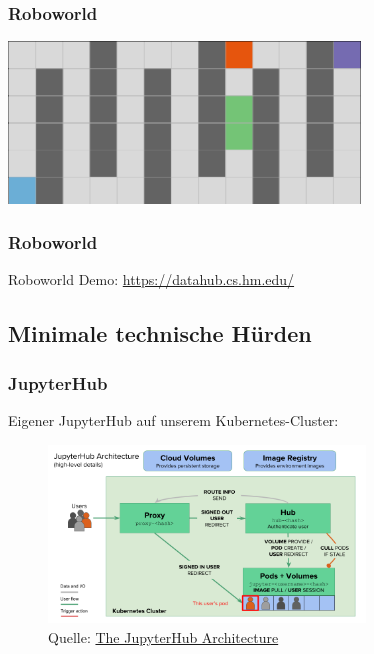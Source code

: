 \documentclass[german,aspectratio=169]{beamer}
\begin{document}
\begin{frame}
	\frametitle{Roboworld}
	\begin{center}
		\includegraphics[width=0.7\textwidth]{./figs/world-simple-maze}
	\end{center}
\end{frame}

\begin{frame}
	\frametitle{Roboworld}
	\begin{center}
		Roboworld Demo: \href{https://datahub.cs.hm.edu/}{https://datahub.cs.hm.edu/}
	\end{center}
\end{frame}

\subsection{Minimale technische Hürden}

\begin{frame}
	\frametitle{JupyterHub}
	Eigener JupyterHub auf unserem Kubernetes-Cluster:
	\begin{figure}
		\includegraphics[width=0.75\textwidth]{./figs/infrastructure}
		\caption{Quelle: \href{https://zero-to-jupyterhub.readthedocs.io/en/latest/administrator/architecture.html}{The JupyterHub Architecture}}
	\end{figure}
\end{frame}
\end{document}
